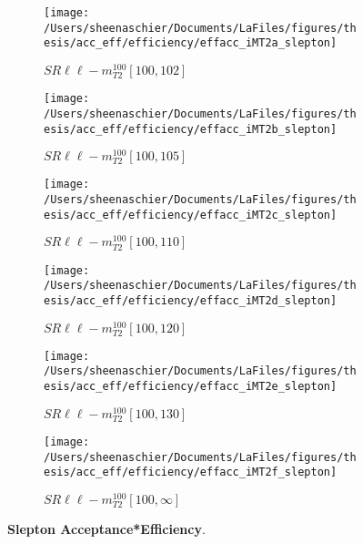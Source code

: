 \begin{figure}
        \centering
    \begin{subfigure}[b]{0.44\textwidth}
        \texttt{[image: /Users/sheenaschier/Documents/LaFiles/figures/thesis/acc\_eff/efficiency/effacc\_iMT2a\_slepton]}
    \caption{$SR\ell\ell-m^{100}_{T2}[100,102]$}
    \end{subfigure}
    \begin{subfigure}[b]{0.44\textwidth}
        \texttt{[image: /Users/sheenaschier/Documents/LaFiles/figures/thesis/acc\_eff/efficiency/effacc\_iMT2b\_slepton]}
    \caption{$SR\ell\ell-m^{100}_{T2}[100,105]$}
    \end{subfigure}
    \begin{subfigure}[b]{0.44\textwidth}
        \texttt{[image: /Users/sheenaschier/Documents/LaFiles/figures/thesis/acc\_eff/efficiency/effacc\_iMT2c\_slepton]}
    \caption{$SR\ell\ell-m^{100}_{T2}[100,110]$}
    \end{subfigure}
    \begin{subfigure}[b]{0.44\textwidth}
        \texttt{[image: /Users/sheenaschier/Documents/LaFiles/figures/thesis/acc\_eff/efficiency/effacc\_iMT2d\_slepton]}
    \caption{$SR\ell\ell-m^{100}_{T2}[100,120]$}
    \end{subfigure}
    \begin{subfigure}[b]{0.44\textwidth}
        \texttt{[image: /Users/sheenaschier/Documents/LaFiles/figures/thesis/acc\_eff/efficiency/effacc\_iMT2e\_slepton]}
    \caption{$SR\ell\ell-m^{100}_{T2}[100,130]$}
    \end{subfigure}
    \begin{subfigure}[b]{0.44\textwidth}
        \texttt{[image: /Users/sheenaschier/Documents/LaFiles/figures/thesis/acc\_eff/efficiency/effacc\_iMT2f\_slepton]}
    \caption{$SR\ell\ell-m^{100}_{T2}[100,\infty]$}
    \end{subfigure}
    \caption{\label{fig:slepton_efficiency_in_acceptance}\textbf{Slepton Acceptance*Efficiency}.}
\end{figure}

